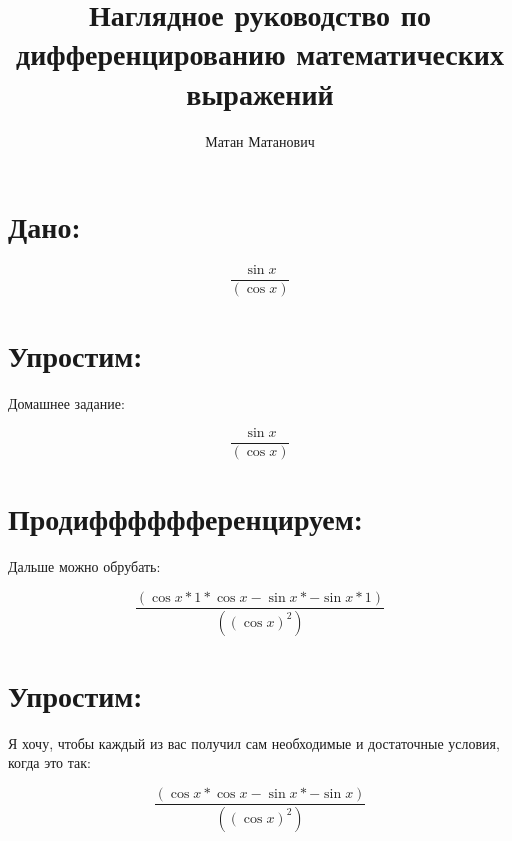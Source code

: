 \documentclass[12pt]{article}
\title{Наглядное руководство по дифференцированию математических выражений}
\author{Матан Матанович}
\begin{document}
\maketitle
\newpage


\section{Дано:}

$$ \frac{\sin{ x } }{ (\cos{ x }) }  $$

\section{Упростим:}

Домашнее задание:

$$ \frac{\sin{ x } }{ (\cos{ x }) }  $$

\section{Продифффффференцируем:}

Дальше можно обрубать:

$$ \frac{(\cos{ x } *  1  * \cos{ x } - \sin{ x } * -{\sin{ x }} *  1 ) }{ ((\cos{ x }) ^  2 ) }  $$

\section{Упростим:}

Я хочу, чтобы каждый из вас получил сам необходимые и достаточные условия, когда это так:

$$ \frac{(\cos{ x } * \cos{ x } - \sin{ x } * -{\sin{ x }}) }{ ((\cos{ x }) ^  2 ) }  $$
\end{document}
